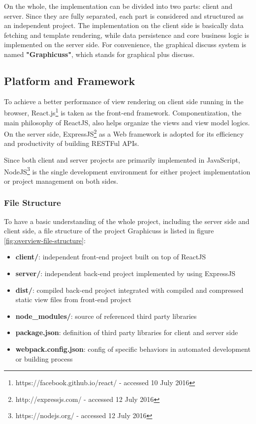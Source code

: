 On the whole, the implementation can be divided into two parts: client and server. Since they are fully separated, each part is considered and structured as an independent project. The implementation on the client side is basically data fetching and template rendering, while data persistence and core business logic is implemented on the server side.  For convenience, the graphical discuss system is named \textbf{"Graphicuss"}, which stands for graphical plus discuss.


\subsection{Platform and Framework}
To achieve a better performance of view rendering on client side running in the browser, React.js\footnote{https://facebook.github.io/react/ - accessed 10 July 2016} is taken as the front-end framework. Componentization, the main philosophy of ReactJS, also helps organize the views and view model logics. On the server side, ExpressJS\footnote{http://expressjs.com/ - accessed 12 July 2016} as a Web framework is adopted for its efficiency and productivity of building RESTFul APIs.

Since both client and server projects are primarily implemented in JavaScript, NodeJS\footnote{https://nodejs.org/ - accessed 12 July 2016} is the single development environment for either project implementation or project management on both sides.

\subsubsection{File Structure}

To have a basic understanding of the whole project, including the server side and client side, a file structure of the project Graphicuss is listed in figure \ref{fig:overview-file-structure}:

\begin{itemize}
\item 
  \textbf{client/}: independent front-end project built on top of ReactJS
\item
  \textbf{server/}: independent back-end project implemented by using ExpressJS
\item
  \textbf{dist/}: compiled back-end project integrated with compiled and compressed static view files from front-end project
\item 
  \textbf{node\_modules/}: source of referenced third party libraries
\item 
  \textbf{package.json}: definition of third party libraries for client and server side
\item 
  \textbf{webpack.config.json}: config of specific behaviors in automated development or building process
\end{itemize}


